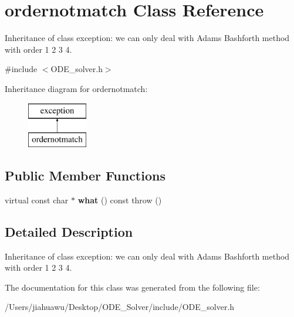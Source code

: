 \hypertarget{classordernotmatch}{}\section{ordernotmatch Class Reference}
\label{classordernotmatch}


Inheritance of class exception\+: we can only deal with Adams Bashforth method with order 1 2 3 4.  




{\ttfamily \#include $<$O\+D\+E\+\_\+solver.\+h$>$}

Inheritance diagram for ordernotmatch\+:\begin{figure}[H]
\begin{center}
\leavevmode
\includegraphics[height=2.000000cm]{classordernotmatch}
\end{center}
\end{figure}
\subsection*{Public Member Functions}
\begin{DoxyCompactItemize}
\item 
\mbox{\label{classordernotmatch_a3cd5dc7766d282739bcaa67a544b42cb}} 
virtual const char $\ast$ {\bfseries what} () const  throw ()
\end{DoxyCompactItemize}


\subsection{Detailed Description}
Inheritance of class exception\+: we can only deal with Adams Bashforth method with order 1 2 3 4. 

The documentation for this class was generated from the following file\+:\begin{DoxyCompactItemize}
\item 
/\+Users/jiahuawu/\+Desktop/\+O\+D\+E\+\_\+\+Solver/include/O\+D\+E\+\_\+solver.\+h\end{DoxyCompactItemize}

